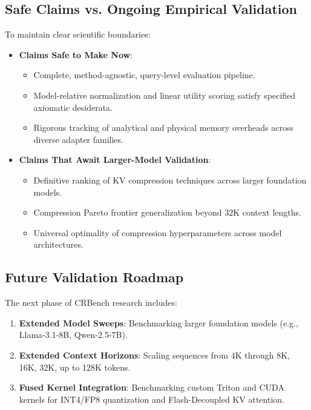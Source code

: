 \documentclass[11pt,a4paper]{article}
\begin{document}
\subsection{Safe Claims vs. Ongoing Empirical Validation}
To maintain clear scientific boundaries:
\begin{itemize}[leftmargin=*,itemsep=0.5pt,topsep=1.0pt,parsep=0pt]
    \item \textbf{Claims Safe to Make Now}:
    \begin{itemize}[itemsep=0.2pt,topsep=0.2pt,parsep=0pt]
        \item Complete, method-agnostic, query-level evaluation pipeline.
        \item Model-relative normalization and linear utility scoring satisfy specified axiomatic desiderata.
        \item Rigorous tracking of analytical and physical memory overheads across diverse adapter families.
    \end{itemize}
    \item \textbf{Claims That Await Larger-Model Validation}:
    \begin{itemize}[itemsep=0.2pt,topsep=0.2pt,parsep=0pt]
        \item Definitive ranking of KV compression techniques across larger foundation models.
        \item Compression Pareto frontier generalization beyond 32K context lengths.
        \item Universal optimality of compression hyperparameters across model architectures.
    \end{itemize}
\end{itemize}

\subsection{Future Validation Roadmap}
The next phase of CRBench research includes:
\begin{enumerate}[leftmargin=*,itemsep=0.5pt,topsep=1.0pt,parsep=0pt]
    \item \textbf{Extended Model Sweeps}: Benchmarking larger foundation models (e.g., Llama-3.1-8B, Qwen-2.5-7B).
    \item \textbf{Extended Context Horizons}: Scaling sequences from 4K through 8K, 16K, 32K, up to 128K tokens.
    \item \textbf{Fused Kernel Integration}: Benchmarking custom Triton and CUDA kernels for INT4/FP8 quantization and Flash-Decoupled KV attention.
\end{enumerate}
\end{document}
